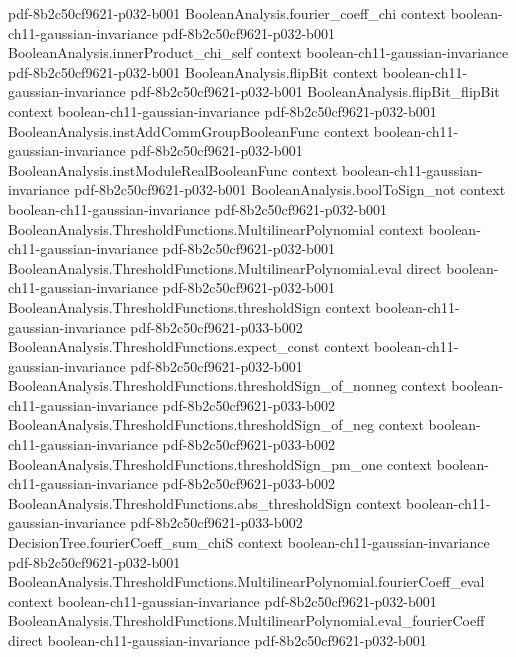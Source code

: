 \begin{lemma}
  {pdf-8b2c50cf9621-p032-b001}
\proofstep
  {BooleanAnalysis.fourier_coeff_chi}
  {context}
  {boolean-ch11-gaussian-invariance}
  {pdf-8b2c50cf9621-p032-b001}
\proofstep
  {BooleanAnalysis.innerProduct_chi_self}
  {context}
  {boolean-ch11-gaussian-invariance}
  {pdf-8b2c50cf9621-p032-b001}
\proofstep
  {BooleanAnalysis.flipBit}
  {context}
  {boolean-ch11-gaussian-invariance}
  {pdf-8b2c50cf9621-p032-b001}
\proofstep
  {BooleanAnalysis.flipBit_flipBit}
  {context}
  {boolean-ch11-gaussian-invariance}
  {pdf-8b2c50cf9621-p032-b001}
\proofstep
  {BooleanAnalysis.instAddCommGroupBooleanFunc}
  {context}
  {boolean-ch11-gaussian-invariance}
  {pdf-8b2c50cf9621-p032-b001}
\proofstep
  {BooleanAnalysis.instModuleRealBooleanFunc}
  {context}
  {boolean-ch11-gaussian-invariance}
  {pdf-8b2c50cf9621-p032-b001}
\proofstep
  {BooleanAnalysis.boolToSign_not}
  {context}
  {boolean-ch11-gaussian-invariance}
  {pdf-8b2c50cf9621-p032-b001}
\proofstep
  {BooleanAnalysis.ThresholdFunctions.MultilinearPolynomial}
  {context}
  {boolean-ch11-gaussian-invariance}
  {pdf-8b2c50cf9621-p032-b001}
\proofstep
  {BooleanAnalysis.ThresholdFunctions.MultilinearPolynomial.eval}
  {direct}
  {boolean-ch11-gaussian-invariance}
  {pdf-8b2c50cf9621-p032-b001}
\proofstep
  {BooleanAnalysis.ThresholdFunctions.thresholdSign}
  {context}
  {boolean-ch11-gaussian-invariance}
  {pdf-8b2c50cf9621-p033-b002}
\proofstep
  {BooleanAnalysis.ThresholdFunctions.expect_const}
  {context}
  {boolean-ch11-gaussian-invariance}
  {pdf-8b2c50cf9621-p032-b001}
\proofstep
  {BooleanAnalysis.ThresholdFunctions.thresholdSign_of_nonneg}
  {context}
  {boolean-ch11-gaussian-invariance}
  {pdf-8b2c50cf9621-p033-b002}
\proofstep
  {BooleanAnalysis.ThresholdFunctions.thresholdSign_of_neg}
  {context}
  {boolean-ch11-gaussian-invariance}
  {pdf-8b2c50cf9621-p033-b002}
\proofstep
  {BooleanAnalysis.ThresholdFunctions.thresholdSign_pm_one}
  {context}
  {boolean-ch11-gaussian-invariance}
  {pdf-8b2c50cf9621-p033-b002}
\proofstep
  {BooleanAnalysis.ThresholdFunctions.abs_thresholdSign}
  {context}
  {boolean-ch11-gaussian-invariance}
  {pdf-8b2c50cf9621-p033-b002}
\proofstep
  {DecisionTree.fourierCoeff_sum_chiS}
  {context}
  {boolean-ch11-gaussian-invariance}
  {pdf-8b2c50cf9621-p032-b001}
\proofstep
  {BooleanAnalysis.ThresholdFunctions.MultilinearPolynomial.fourierCoeff_eval}
  {context}
  {boolean-ch11-gaussian-invariance}
  {pdf-8b2c50cf9621-p032-b001}
\proofstep
  {BooleanAnalysis.ThresholdFunctions.MultilinearPolynomial.eval_fourierCoeff}
  {direct}
  {boolean-ch11-gaussian-invariance}
  {pdf-8b2c50cf9621-p032-b001}

\end{lemma}
